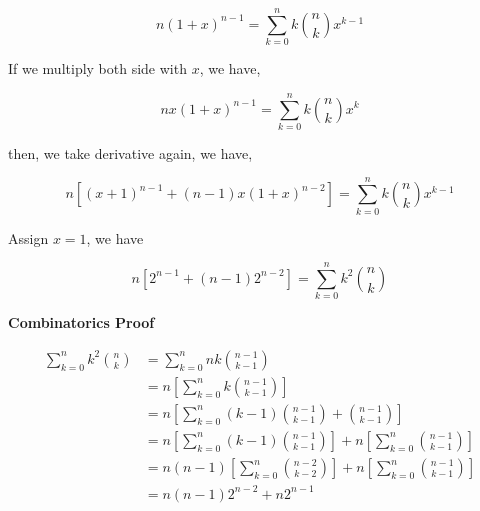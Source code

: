 \documentclass{article}
\begin{document}
$$n(1+x)^{n-1} = \sum \limits_{k=0}^{n} k {n \choose k} x^{k-1}$$

If we multiply both side with $x$, we have,

$$nx(1+x)^{n - 1} = \sum \limits_{k=0}^{n} k {n \choose k} x^{k}$$

then, we take derivative again, we have,

$$n\left[ (x+1)^{n-1} + (n-1)x(1+x)^{n-2}\right] = \sum \limits_{k=0}^{n} k {n \choose k} x^{k - 1}$$

Assign $x = 1$, we have

$$n\left[ 2^{n-1} + (n-1)2^{n-2} \right] = \sum \limits_{k=0}^{n} k^2 {n \choose k} $$

\textbf{Combinatorics  Proof}

\[
\begin{split}
\sum \limits_{k = 0}^{n}k^2{n \choose k} &= \sum \limits_{k = 0}^{n} nk{n - 1 \choose k - 1} \\
                                        &= n \left [\sum \limits_{k = 0}^{n} k{n - 1 \choose k - 1} \right ]\\
                                        &= n \left [\sum \limits_{k = 0}^{n} (k - 1){n - 1 \choose k - 1} +  {n - 1 \choose k - 1}\right ] \\
                                        &= n \left [\sum \limits_{k = 0}^{n} (k - 1){n - 1 \choose k - 1}\right ]  +  n \left [\sum \limits_{k = 0}^{n} {n - 1 \choose k - 1}\right ] \\
                                         &= n(n-1) \left [\sum \limits_{k = 0}^{n}{n - 2 \choose k - 2}\right ]  +  n \left [\sum \limits_{k = 0}^{n} {n - 1 \choose k - 1}\right ] \\
                                         &= n(n-1)2^{n-2} + n2^{n-1}
\end{split} 
\]
\end{document}
